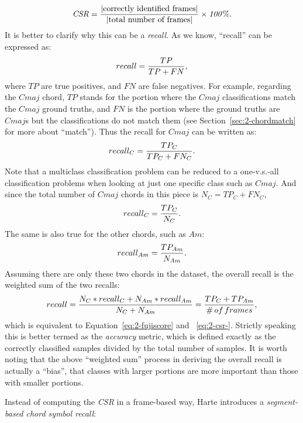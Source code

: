 \begin{equation}\label{eq:2-csr-}
\mathit{CSR={|\text{correctly identified frames}| \over |\text{total number of frames}|}\times 100\%}.
\end{equation}
It is better to clarify why this can be a \textit{recall}. As we know, ``recall'' can be expressed as:
\begin{equation}
recall = {TP \over {TP + FN}},
\end{equation}
where $TP$ are true positives, and $FN$ are false negatives. For example, regarding the $Cmaj$ chord, $TP$ stands for the portion where the $Cmaj$ classifications match the $Cmaj$ ground truths, and $FN$ is the portion where the ground truths are $Cmaj$s but the classifications do not match them (see Section~\ref{sec:2-chordmatch} for more about ``match''). Thus the recall for $Cmaj$ can be written as:
\begin{equation}
recall_C = {TP_C \over {TP_C + FN_C}}.
\end{equation}
Note that a multiclass classification problem can be reduced to a one-v.s.-all classification problems when looking at just one specific class such as $Cmaj$. And since the total number of $Cmaj$ chords in this piece is $N_C = TP_C + FN_C$,
\begin{equation}
recall_C = {TP_C \over N_C}.
\end{equation}
The same is also true for the other chords, such as $Am$:
\begin{equation}
recall_{Am}= {TP_{Am} \over N_{Am}}.
\end{equation}
Assuming there are only these two chords in the dataset, the overall recall is the weighted sum of the two recalls:
\begin{equation}
recall = {{N_C * recall_C + N_{Am} * recall_{Am}} \over {N_C + N_{Am}}} = {{TP_C + TP_{Am}} \over {\#\,of\,frames}},
\end{equation}
which is equivalent to Equation~\ref{eq:2-fujiscore} and ~\ref{eq:2-csr-}. Strictly speaking this is better termed as the \textit{accuracy} metric, which is defined exactly as the correctly classified samples divided by the total number of samples. It is worth noting that the above ``weighted sum'' process in deriving the overall recall is actually a ``bias'', that classes with larger portions are more important than those with smaller portions.

Instead of computing the \textit{CSR} in a frame-based way, Harte \cite{harte2010towards} introduces a {\it segment-based chord symbol recall}:

